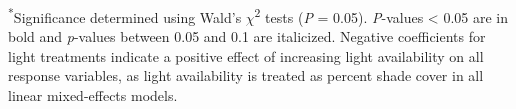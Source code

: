 \begin{singlespace}
\noindent \textsuperscript{*}Significance determined using Wald’s $\chi$\textsuperscript{2} tests (\textit{P} = 0.05). \textit{P}-values < 0.05 are in bold and \textit{p}-values between 0.05 and 0.1 are italicized. Negative coefficients for light treatments indicate a positive effect of increasing light availability on all response variables, as light availability is treated as percent shade cover in all linear mixed-effects models.
\end{singlespace}
\clearpage